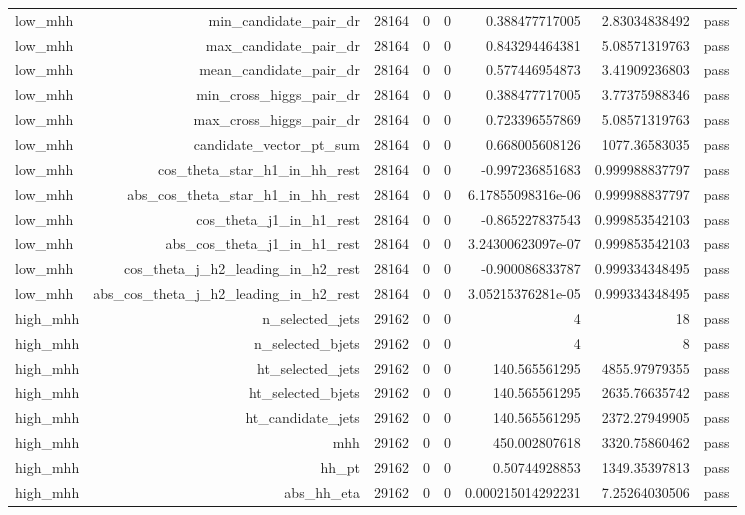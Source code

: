 \begin{table}[htbp]
{\begin{tabular}{lrrrrrrr}
low\_mhh & min\_candidate\_pair\_dr & 28164 & 0 & 0 & 0.388477717005 & 2.83034838492 & pass \\
low\_mhh & max\_candidate\_pair\_dr & 28164 & 0 & 0 & 0.843294464381 & 5.08571319763 & pass \\
low\_mhh & mean\_candidate\_pair\_dr & 28164 & 0 & 0 & 0.577446954873 & 3.41909236803 & pass \\
low\_mhh & min\_cross\_higgs\_pair\_dr & 28164 & 0 & 0 & 0.388477717005 & 3.77375988346 & pass \\
low\_mhh & max\_cross\_higgs\_pair\_dr & 28164 & 0 & 0 & 0.723396557869 & 5.08571319763 & pass \\
low\_mhh & candidate\_vector\_pt\_sum & 28164 & 0 & 0 & 0.668005608126 & 1077.36583035 & pass \\
low\_mhh & cos\_theta\_star\_h1\_in\_hh\_rest & 28164 & 0 & 0 & -0.997236851683 & 0.999988837797 & pass \\
low\_mhh & abs\_cos\_theta\_star\_h1\_in\_hh\_rest & 28164 & 0 & 0 & 6.17855098316e-06 & 0.999988837797 & pass \\
low\_mhh & cos\_theta\_j1\_in\_h1\_rest & 28164 & 0 & 0 & -0.865227837543 & 0.999853542103 & pass \\
low\_mhh & abs\_cos\_theta\_j1\_in\_h1\_rest & 28164 & 0 & 0 & 3.24300623097e-07 & 0.999853542103 & pass \\
low\_mhh & cos\_theta\_j\_h2\_leading\_in\_h2\_rest & 28164 & 0 & 0 & -0.900086833787 & 0.999334348495 & pass \\
low\_mhh & abs\_cos\_theta\_j\_h2\_leading\_in\_h2\_rest & 28164 & 0 & 0 & 3.05215376281e-05 & 0.999334348495 & pass \\
high\_mhh & n\_selected\_jets & 29162 & 0 & 0 & 4 & 18 & pass \\
high\_mhh & n\_selected\_bjets & 29162 & 0 & 0 & 4 & 8 & pass \\
high\_mhh & ht\_selected\_jets & 29162 & 0 & 0 & 140.565561295 & 4855.97979355 & pass \\
high\_mhh & ht\_selected\_bjets & 29162 & 0 & 0 & 140.565561295 & 2635.76635742 & pass \\
high\_mhh & ht\_candidate\_jets & 29162 & 0 & 0 & 140.565561295 & 2372.27949905 & pass \\
high\_mhh & mhh & 29162 & 0 & 0 & 450.002807618 & 3320.75860462 & pass \\
high\_mhh & hh\_pt & 29162 & 0 & 0 & 0.50744928853 & 1349.35397813 & pass \\
high\_mhh & abs\_hh\_eta & 29162 & 0 & 0 & 0.000215014292231 & 7.25264030506 & pass \\

\end{tabular}}
\end{table}
